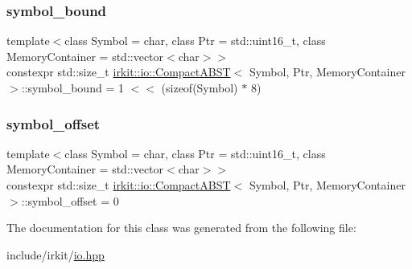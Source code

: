 \mbox{\label{classirkit_1_1io_1_1CompactABST_ac57833960df6fee1cf2643e82cfb0216}} 
\subsubsection{\texorpdfstring{symbol\+\_\+bound}{symbol\_bound}}
{\footnotesize\ttfamily template$<$class Symbol = char, class Ptr = std\+::uint16\+\_\+t, class Memory\+Container = std\+::vector$<$char$>$$>$ \\
constexpr std\+::size\+\_\+t \mbox{\hyperlink{classirkit_1_1io_1_1CompactABST}{irkit\+::io\+::\+Compact\+A\+B\+ST}}$<$ Symbol, Ptr, Memory\+Container $>$\+::symbol\+\_\+bound = 1 $<$$<$ (sizeof(Symbol) $\ast$ 8)\hspace{0.3cm}{\ttfamily [static]}}

\mbox{\label{classirkit_1_1io_1_1CompactABST_a79cef12b8e2acd8b65c106deb9d87ebe}} 
\subsubsection{\texorpdfstring{symbol\+\_\+offset}{symbol\_offset}}
{\footnotesize\ttfamily template$<$class Symbol = char, class Ptr = std\+::uint16\+\_\+t, class Memory\+Container = std\+::vector$<$char$>$$>$ \\
constexpr std\+::size\+\_\+t \mbox{\hyperlink{classirkit_1_1io_1_1CompactABST}{irkit\+::io\+::\+Compact\+A\+B\+ST}}$<$ Symbol, Ptr, Memory\+Container $>$\+::symbol\+\_\+offset = 0\hspace{0.3cm}{\ttfamily [static]}}



The documentation for this class was generated from the following file\+:\begin{DoxyCompactItemize}
\item 
include/irkit/\mbox{\hyperlink{io_8hpp}{io.\+hpp}}\end{DoxyCompactItemize}
